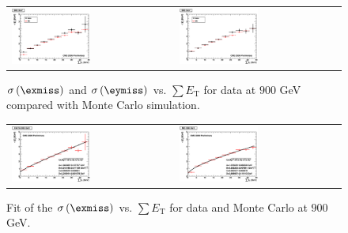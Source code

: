 \begin{figure}[h!]
 \centering
 \begin{tabular}{ll}
  \includegraphics[width=0.5\textwidth]{plots_DataVsMC_MB_900GeV/h_metxsigma_sumet_900.eps} &
  \includegraphics[width=0.5\textwidth]{plots_DataVsMC_MB_900GeV/h_metysigma_sumet_900.eps} \\
 \end{tabular}
 \caption{\small $\sigma\left(\exmiss\right)$ and $\sigma\left(\eymiss\right)$ vs. $\sum E_\text{T}$ for data at $900$ GeV
          compared with Monte Carlo simulation.\label{fig:MExySigma_vs_SumET_900}}
\end{figure}

\begin{figure}[h!]
 \centering
 \begin{tabular}{ll}
  \includegraphics[width=0.5\textwidth]{plots_DataVsMC_MB_900GeV/final_metxsigma_sumet_DATA_900.eps} &
  \includegraphics[width=0.5\textwidth]{plots_DataVsMC_MB_900GeV/final_metxsigma_sumet_MC_900.eps} \\
 \end{tabular}
 \caption{\small Fit of the $\sigma\left(\exmiss\right)$ vs. $\sum E_\text{T}$ for data and Monte Carlo at $900$ GeV.\label{fig:MExSigma_vs_SumET_900_fit}}
\end{figure}

